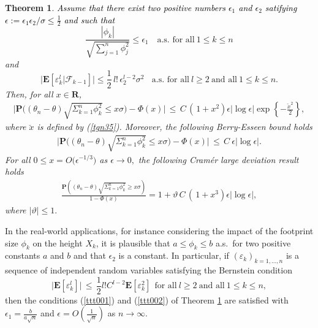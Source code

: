 \documentclass{gSTA2e}
\theoremstyle{plain}
\newtheorem{theorem}{Theorem}[section]
\theoremstyle{definition}
\theoremstyle{remark}
\begin{document}
\begin{theorem}\label{th3.1} \textcolor{black}{Assume that there exist  two positive numbers $\epsilon_1$ and $\epsilon_2$ satifying
$\epsilon :=  \epsilon_1 \epsilon_2/ \sigma \leq \frac12$
and such that}
\begin{equation}
\frac{|\phi_{k}|}{\sqrt{\sum_{j=1}^n \phi_{j}^2}} \leq \epsilon_1  \  \ \    \textrm{ a.s.\ for all}\ 1\leq k\leq n
\label{ttt001}
\end{equation}
and
\begin{equation}
\Big|\mathbf{E}[ \varepsilon_{k}^{l} | \mathcal{F}_{k-1} ]  \Big| \leq \frac12\, l!\, \epsilon_2^{l-2} \sigma^2 \  \   \ \ \textrm{a.s.\ for all}\ l\geq 2\ \textrm{and all}\  1\leq k\leq n.
\label{ttt002}
\end{equation}
Then, for all $x \in \mathbf{R}$,
\begin{eqnarray}\label{th5ineq}
 \Big|\mathbf{P}\Big( (\theta_n -\theta)\sqrt{ \Sigma_{k=1}^n \phi_{k}^2} \leq x \sigma  \Big) - \Phi(x)  \Big| \, \leq \, C\, \left(\frac{}{}\! 1+ x^2 \right) \epsilon  \left|\log \epsilon  \right|  \exp\left\{-\frac{ \breve{x} ^2}{2}\right\} ,
\end{eqnarray}
where $ \breve{x} $ is defined by (\ref{tgn35}).
Moreover,   the following Berry-Esseen bound holds
\begin{eqnarray}
  \Big|\mathbf{P}\Big( (\theta_n -\theta)\sqrt{ \Sigma _{k=1}^n \phi_{k}^2} \leq x \sigma  \Big) - \Phi(x)  \Big| \, \leq \, C\ \epsilon \left|\log \epsilon  \right|.
\end{eqnarray}
For all $ 0\leq x  =O\big(\epsilon^{-1/3}  \big)$ as $\epsilon  \rightarrow 0,$ the following Cram\'{e}r large deviation result holds
\begin{eqnarray}\label{th5ineq}
  \frac{\mathbf{P}\left( (\theta_n -\theta)\sqrt{ \Sigma _{k=1}^n \phi_{k}^2} \geq x \sigma  \right)}{1-  \Phi(x) } =1+   \vartheta \, C \,\left(\frac{}{}\! 1+ x^3 \right) \epsilon \left|\log \epsilon  \right| ,
\end{eqnarray}
where $|\vartheta|\leq 1.$
\end{theorem}

In the real-world applications, for instance considering the impact of the footprint size $\phi_{k}$ on the height $X_k$, it is plausible that
$a\leq \phi_{k} \leq b $ a.s.\ for two positive constants $a$ and $b$ and that $ \epsilon_2$ is a constant. In particular, if $(\varepsilon_{k})_{k=1,...,n}$ is a sequence of independent
random variables satisfying the Bernstein  condition
\[
  \Big|\mathbf{E} [ \varepsilon_{k}^l ] \Big|  \,  \leq \, \frac12  l! C^{l-2}  \mathbf{E} [\varepsilon_{k}^2 ]  \ \ \textrm{for all}\ l\geq 2\  \textrm{and all}\ 1\leq k\leq n,
\]
then the conditions (\ref{ttt001}) and  (\ref{ttt002}) of Theorem \ref{th3.1} are  satisfied with $\epsilon_1 = \frac{b}{a \sqrt{n  } }$ and $\epsilon=O(\frac1{\sqrt{n}})$ as $n \rightarrow \infty.$
\end{document}
